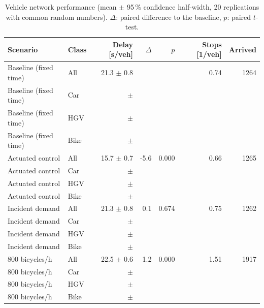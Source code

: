 \begin{table}[H]
\centering
\caption{Vehicle network performance (mean $\pm$ 95\,\% confidence half-width, 20 replications with common random numbers). $\Delta$: paired difference to the baseline, $p$: paired $t$-test.}
\label{tab:altperf}
\small
\begin{tabular}{llrrrrr}
\toprule
\textbf{Scenario} & \textbf{Class} & \textbf{Delay [s/veh]} & $\Delta$ & $p$ & \textbf{Stops [1/veh]} & \textbf{Arrived}\\
\midrule
Baseline (fixed time) & All & 21.3 $\pm$ 0.8 &  &  & 0.74 & 1264\\
Baseline (fixed time) & Car &  $\pm$  &  &  &  & \\
Baseline (fixed time) & HGV &  $\pm$  &  &  &  & \\
Baseline (fixed time) & Bike &  $\pm$  &  &  &  & \\
Actuated control & All & 15.7 $\pm$ 0.7 & -5.6 & 0.000 & 0.66 & 1265\\
Actuated control & Car &  $\pm$  &  &  &  & \\
Actuated control & HGV &  $\pm$  &  &  &  & \\
Actuated control & Bike &  $\pm$  &  &  &  & \\
Incident demand & All & 21.3 $\pm$ 0.8 & 0.1 & 0.674 & 0.75 & 1262\\
Incident demand & Car &  $\pm$  &  &  &  & \\
Incident demand & HGV &  $\pm$  &  &  &  & \\
Incident demand & Bike &  $\pm$  &  &  &  & \\
800 bicycles/h & All & 22.5 $\pm$ 0.6 & 1.2 & 0.000 & 1.51 & 1917\\
800 bicycles/h & Car &  $\pm$  &  &  &  & \\
800 bicycles/h & HGV &  $\pm$  &  &  &  & \\
800 bicycles/h & Bike &  $\pm$  &  &  &  & \\
\bottomrule
\end{tabular}
\end{table}

